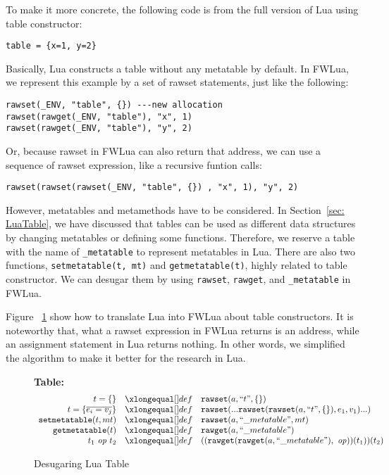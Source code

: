 To make it more concrete, the following code is from the full version of Lua using table constructor:

\begin{verbatim}
table = {x=1, y=2}
\end{verbatim}

Basically, Lua constructs a table without any metatable by default. In FWLua, we represent this example by a set of rawset statements, just like the following:

\begin{verbatim}
rawset(_ENV, "table", {}) ---new allocation
rawset(rawget(_ENV, "table"), "x", 1)
rawset(rawget(_ENV, "table"), "y", 2)
\end{verbatim}

Or, because rawset in FWLua can also return that address, we can use a sequence of rawset expression, like a recursive funtion calls:
\begin{verbatim}
rawset(rawset(rawset(_ENV, "table", {}) , "x", 1), "y", 2)
\end{verbatim}

However, metatables and metamethods have to be considered. In Section~\ref{sec: LuaTable}, we have discussed that tables can be used as different data structures by changing metatables or defining some functions. Therefore, we reserve a table with the name of {\tt \_metatable} to represent metatables in Lua. There are also two functions, {\tt setmetatable(t, mt)} and {\tt getmetatable(t)}, highly related to table constructor. We can desugar them by using {\tt rawset}, {\tt rawget}, and {\tt \_metatable} in FWLua.

Figure ~\ref{fig:desLuaTable} show how to translate Lua into FWLua about table constructors. It is noteworthy that, what a rawset expression in FWLua returns is an address, while an assignment statement in Lua returns nothing. In other words, we simplified the algorithm to make it better for the research in Lua.

\begin{figure}
\caption{Desugaring Lua Table}\label{fig:desLuaTable}
{\bf Table:}\[
\begin{array}{rclcl}
\desugar{t = \{\}}{{\tt rawset}(a,``t", \{\})}
\desugar{t = \{\overline{e_i = v_j}\}}{{\tt rawset}(...{\tt rawset}({\tt rawset}(a,``t", \{\}), e_1, v_1)...)}
\desugar{{\tt setmetatable}(t, mt)}{{\tt rawset}(a,``\_metatable", mt)}
\desugar{{\tt getmetatable}(t)}{{\tt rawget}(a,``\_metatable")}
\desugar{t_1~{\it op}~t_2}{(({\tt rawget}({\tt rawget}(a,``\_metatable"),~{\it op}))(t_1))(t_2)}
\end{array}\]
\end{figure}

